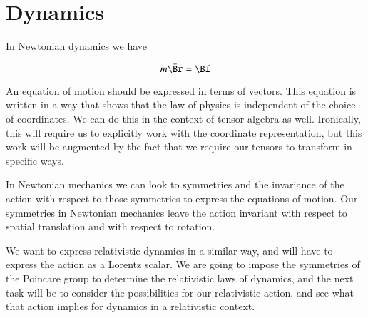 %
%
\section{Dynamics}

In Newtonian dynamics we have

\begin{equation}\label{eqn:relativisticElectrodynamicsL6:250}
m \ddot{\Br} = \Bf
\end{equation}

An equation of motion should be expressed in terms of vectors.  This equation is written in a way that shows that the law of physics is independent of the choice of coordinates.  We can do this in the context of tensor algebra as well.  Ironically, this will require us to explicitly work with the coordinate representation, but this work will be augmented by the fact that we require our tensors to transform in specific ways.

In Newtonian mechanics we can look to symmetries and the invariance of the action with respect to those symmetries to express the equations of motion.  Our symmetries in Newtonian mechanics leave the action invariant with respect to spatial translation and with respect to rotation.

We want to express relativistic dynamics in a similar way, and will have to express the action as a Lorentz scalar.  We are going to impose the symmetries of the Poincare group to determine the relativistic laws of dynamics, and the next task will be to consider the possibilities for our relativistic action, and see what that action implies for dynamics in a relativistic context.

